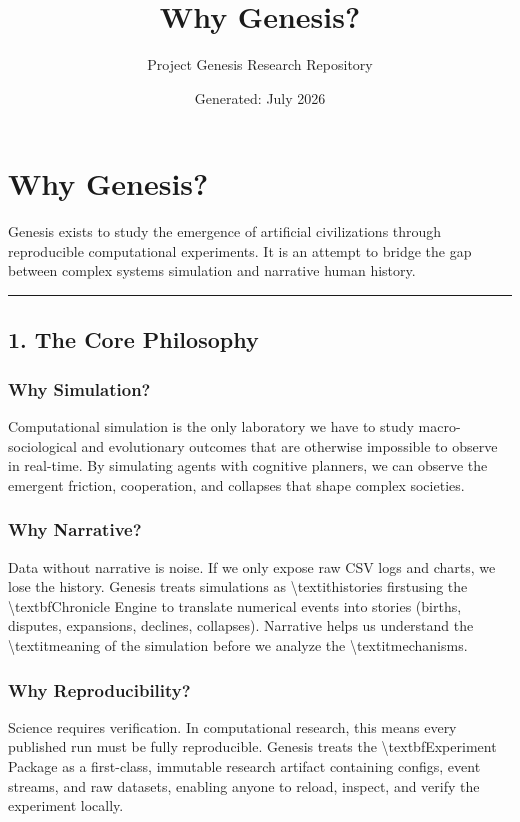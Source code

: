\documentclass[11pt,a4paper]{article}
\title{\textbf{Why Genesis?}}
\author{Project Genesis Research Repository}
\date{\small Generated: July 2026}
\begin{document}
\maketitle
\thispagestyle{empty}

\newpage
\section*{Why Genesis?}

Genesis exists to study the emergence of artificial civilizations through reproducible computational experiments. It is an attempt to bridge the gap between complex systems simulation and narrative human history.

\noindent\rule{\textwidth}{0.4pt}

\subsection*{1. The Core Philosophy}

\subsubsection*{Why Simulation?}
Computational simulation is the only laboratory we have to study macro-sociological and evolutionary outcomes that are otherwise impossible to observe in real-time. By simulating agents with cognitive planners, we can observe the emergent friction, cooperation, and collapses that shape complex societies.

\subsubsection*{Why Narrative?}
Data without narrative is noise. If we only expose raw CSV logs and charts, we lose the history. Genesis treats simulations as \textbackslash{}textit{histories} firstusing the \textbackslash{}textbf{Chronicle Engine} to translate numerical events into stories (births, disputes, expansions, declines, collapses). Narrative helps us understand the \textbackslash{}textit{meaning} of the simulation before we analyze the \textbackslash{}textit{mechanisms}.

\subsubsection*{Why Reproducibility?}
Science requires verification. In computational research, this means every published run must be fully reproducible. Genesis treats the \textbackslash{}textbf{Experiment Package} as a first-class, immutable research artifact containing configs, event streams, and raw datasets, enabling anyone to reload, inspect, and verify the experiment locally.
\end{document}
